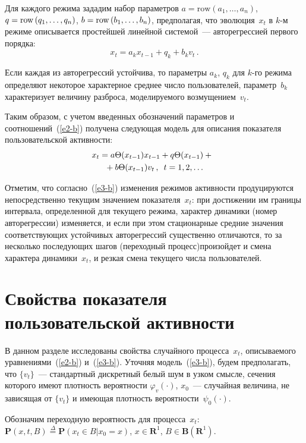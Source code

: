 \begin{multicols}{2}
  Для каждого режима зададим набор па\-ра\-мет\-ров 
  $a =\mathrm{row} \left( a_1, \ldots ,a_n\right)$, 
$q\hm=\mathrm{row}\left( q_1, \ldots , q_n\right)$, 
$b\hm=\mathrm{row}\left( b_1, \ldots , b_n\right)$, предполагая, что 
эволюция~$x_t$ в $k$-м режиме описывается простейшей линейной сис\-те\-мой~--- 
авторегрессией первого порядка:
  $$
  x_t=a_k x_{t-1} +q_k+b_k v_t\,.
  $$
  
  Если каждая из авторегрессий устойчива, то параметры $a_k$, $q_k$ для $k$-го режима 
определяют некоторое характерное среднее число пользователей, параметр~$b_k$ 
характеризует величину разброса, моделируемого возмущением~$v_t$.
  
  Таким образом, с учетом введенных обозначений параметров и соотношений~(\ref{e2-b}) 
получена следующая модель для описания показателя пользовательской активности:
\begin{multline}
  \!\!x_t=a\Theta(x_{t-1}) x_{t-1} +q\Theta(x_{t-1})+{}\\
  {}+b\Theta (x_{t-1})v_t\,, \enskip
  t=1, 2, \ldots
  \label{e3-b}
  \end{multline}
  
  Отметим, что согласно~(\ref{e3-b}) изменения режимов активности продуцируются 
непосредственно текущим значением показателя~$x_t$: при достижении им границы 
интервала, определенной для текущего режима, характер динамики (номер авторегрессии)\linebreak 
изменяется, и если при этом стационарные средние значения соответствующих устойчивых 
авторегрессий существенно отличаются, то за несколько последующих шагов (переходный 
процесс)\linebreak про\-изойдет и смена характера динамики~$x_t$, и резкая смена текущего числа 
пользователей.
  
\section{Свойства показателя пользовательской активности}
  
  В данном разделе исследованы свойства случайного процесса~$x_t$, описываемого 
уравнениями~(\ref{e2-b}) и~(\ref{e3-b}). Уточняя модель~(\ref{e3-b}), будем предполагать, 
что $\{v_t\}$~--- стандартный дискретный белый шум в узком смысле, сечения которого 
имеют плотность вероятности $\varphi_v(\cdot)$, $x_0$~--- случайная величина, не зависящая от 
$\{v_t\}$ и имеющая плотность вероятности~$\psi_0(\cdot)$.
  
  Обозначим переходную вероятность для процесса~$x_t$: 
$\mathbf{P}(x,t,B)\overset{\Delta}{=}\mathbf{P}(x_t\in B\vert x_0=x)$, $x\in \mathbf{R}^1$, 
$B\in \mathbf{B}(\mathbf{R}^1)$.
  

\end{multicols}
